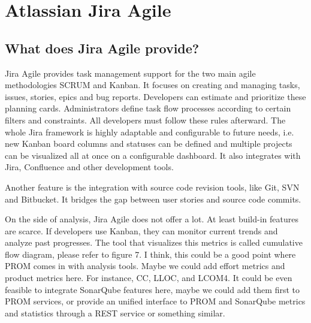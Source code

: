 \section{Atlassian Jira Agile}
\subsection{What does Jira Agile provide?}

Jira Agile provides task management support for the two main agile methodologies
SCRUM and Kanban. It focuses on creating and managing tasks, issues, stories,
epics and bug reports. Developers can estimate and prioritize these planning
cards. Administrators define task flow processes according to certain filters
and constraints. All developers must follow these rules afterward. The whole
Jira framework is highly adaptable and configurable to future needs, i.e. new
Kanban board columns and statuses can be defined and multiple projects can be
visualized all at once on a configurable dashboard. It also integrates with
Jira, Confluence and other development tools. 

Another feature is the integration with source code revision tools, like Git,
SVN and Bitbucket. It bridges the gap between user stories and source code
commits.

On the side of analysis, Jira Agile does not offer a lot. At least build-in
features are scarce. If developers use Kanban, they can monitor current trends
and analyze past progresses. The tool that visualizes this metrics is called
cumulative flow diagram, please refer to figure 7. I think, this could be a good
point where PROM comes in with analysis tools. Maybe we could add effort metrics
and product metrics here. For instance, CC, LLOC, and LCOM4. It could be even
feasible to integrate SonarQube features here, maybe we could add them first to
PROM services, or provide an unified interface to PROM and SonarQube metrics and
statistics through a REST service or something similar.
